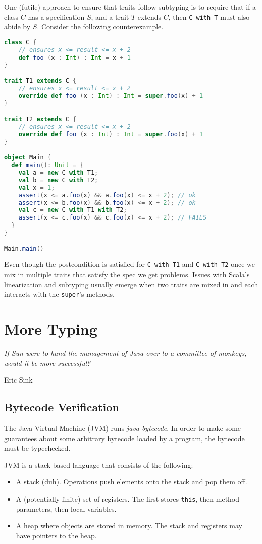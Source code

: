 \documentclass{article}
\begin{document}
\begin{example}
  One (futile) approach to ensure that traits follow \behavioral{} subtyping is to require that if a class $C$ has a specification $S$, and a trait $T$ extends $C$, then \texttt{C with T} must also abide by $S$.
  Consider the following counterexample.
\begin{lstlisting}[language=Scala, escapechar=|]
class C {
    // ensures x <= result <= x + 2
    def foo (x : Int) : Int = x + 1
}

trait T1 extends C {
    // ensures x <= result <= x + 2
    override def foo (x : Int) : Int = super.foo(x) + 1
}

trait T2 extends C {
    // ensures x <= result <= x + 2
    override def foo (x : Int) : Int = super.foo(x) + 1
}

object Main {
  def main(): Unit = {
    val a = new C with T1;
    val b = new C with T2;
    val x = 1;
    assert(x <= a.foo(x) && a.foo(x) <= x + 2); // ok
    assert(x <= b.foo(x) && b.foo(x) <= x + 2); // ok
    val c = new C with T1 with T2;
    assert(x <= c.foo(x) && c.foo(x) <= x + 2); // FAILS
  }
}

Main.main()
\end{lstlisting}
  Even though the postcondition is satisfied for \texttt{C with T1} and \texttt{C with T2} once we mix in multiple traits that satisfy the spec we get problems.
  Issues with Scala's linearization and \behavioral{} subtyping usually emerge when two traits are mixed in and each interacts with the \texttt{super}'s methods.
\end{example}

\section{More Typing}

\epigraph{\itshape If Sun were to hand the management of Java over to a committee of monkeys, would it be more successful?}{Eric Sink}

\subsection{Bytecode Verification}

The Java Virtual Machine (JVM) runs \textit{java bytecode}. In order to make some guarantees about some arbitrary bytecode loaded by a program, the bytecode must be typechecked.

\begin{definition}
JVM is a stack-based language that consists of the following:
\begin{itemize}
\item A stack (duh). Operations push elements onto the stack and pop them off.
\item A (potentially finite) set of registers. The first stores \texttt{this}, then method parameters, then local variables.
\item A heap where objects are stored in memory. The stack and registers may have pointers to the heap.
\end{itemize}
\end{definition}
\end{document}
